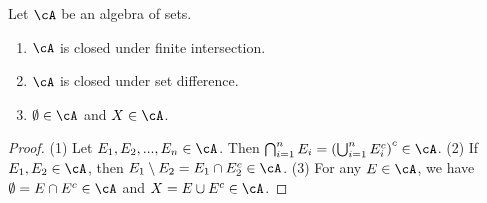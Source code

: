     \begin{proposition}
        Let $\cA$ be an algebra of sets.
        \begin{enumerate}[label = (\arabic*),itemsep=1pt,topsep=3pt]
            \item $\cA$ is closed under finite intersection.
            \item $\cA$ is closed under set difference.
            \item $\emptyset \in \cA$ and $X \in \cA$.
        \end{enumerate}
    \end{proposition}
        \begin{proof}
            (1) Let $E_1,E_2,...,E_n \in \cA$. Then $\bigcap_{i = 1}^n E_i = \left( \bigcup_{i=1}^n E_i^c \right)^c \in \cA$. (2) If $E_1,E_2 \in \cA$, then $E_1 \setminus E_2 = E_1 \cap E_2^c \in \cA$. (3) For any $E \in \cA$, we have $\emptyset = E \cap E^c \in \cA$ and $X = E \cup E^c \in \cA$.
        \end{proof}

